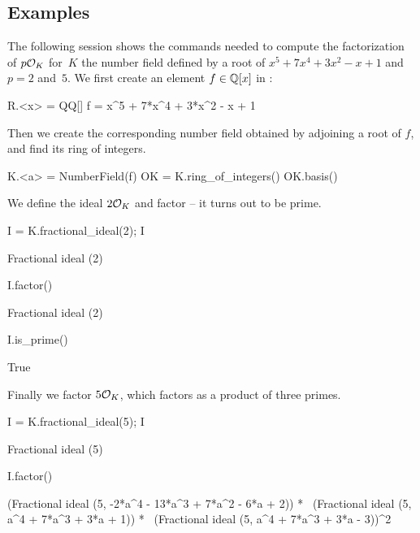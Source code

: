 \subsection{Examples}

The following {\Sage} session shows the commands needed to compute
the factorization of $p\mathcal{O}_K$ for~$K$ the number field defined by
a root of $x^5 + 7x^4 + 3x^2 - x + 1$ and $p = 2$ and~$5$. We first
create an element $f\in \mathbb{Q}[x]$ in {\Sage}:
\begin{sagecode}
\begin{sagecell}
R.<x> = QQ[]
f = x^5 + 7*x^4 + 3*x^2 - x + 1
\end{sagecell}
\end{sagecode} %

\noindent
Then we create the corresponding number field obtained
by adjoining a root of $f$, and find its ring of integers.
\begin{sagecode}
\begin{sagecell}
K.<a> = NumberField(f)
OK = K.ring_of_integers()
OK.basis()
\end{sagecell}
\begin{sageout}
[1, a, a^2, a^3, a^4]
\end{sageout}
\end{sagecode} %

\noindent
We define the ideal $2\mathcal{O}_K$ and factor -- it turns out to be prime.

\begin{sagecode}
\begin{sagecell}
I = K.fractional_ideal(2); I
\end{sagecell}
\begin{sageout}
Fractional ideal (2)
\end{sageout}
\begin{sagecell}
I.factor()
\end{sagecell}
\begin{sageout}
Fractional ideal (2)
\end{sageout}
\begin{sagecell}
I.is_prime()
\end{sagecell}
\begin{sageout}
True
\end{sageout}
\end{sagecode} %

\noindent
Finally we factor $5\mathcal{O}_K$, which factors as a product of three primes.

\begin{sagecode}
\begin{sagecell}
I = K.fractional_ideal(5); I
\end{sagecell}
\begin{sageout}
Fractional ideal (5)
\end{sageout}
\begin{sagecell}
I.factor()
\end{sagecell}
\begin{sageout}
(Fractional ideal (5, -2*a^4 - 13*a^3 + 7*a^2 - 6*a + 2)) * \
(Fractional ideal (5, a^4 + 7*a^3 + 3*a + 1)) * \
(Fractional ideal (5, a^4 + 7*a^3 + 3*a - 3))^2
\end{sageout}
\end{sagecode} %

